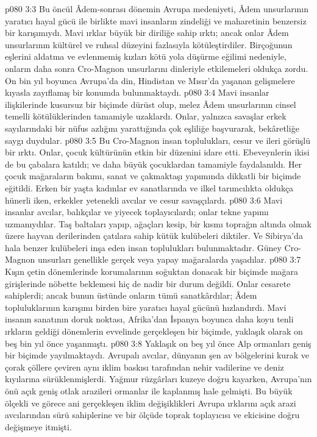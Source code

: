 \vs p080 3:3 Bu öncül Âdem\hyp{}sonrası dönemin Avrupa medeniyeti, Âdem unsurlarının yaratıcı hayal gücü ile birlikte mavi insanların zindeliği ve maharetinin benzersiz bir karışımıydı. Mavi ırklar büyük bir diriliğe sahip ırktı; ancak onlar Âdem unsurlarının kültürel ve ruhsal düzeyini fazlasıyla kötüleştirdiler. Birçoğunun eşlerini aldatma ve evlenmemiş kızları kötü yola düşürme eğilimi nedeniyle, onların daha sonra Cro\hyp{}Magnon unsurlarını dinleriyle etkilemeleri oldukça zordu. On bin yıl boyunca Avrupa’da din, Hindistan ve Mısır’da yaşanan gelişmelere kıyasla zayıflamış bir konumda bulunmaktaydı.
\vs p080 3:4 Mavi insanlar ilişkilerinde kusursuz bir biçimde dürüst olup, melez Âdem unsurlarının cinsel temelli kötülüklerinden tamamiyle uzaklardı. Onlar, yalnızca savaşlar erkek sayılarındaki bir nüfus azlığını yarattığında çok eşliliğe başvurarak, bekâretliğe saygı duydular.
\vs p080 3:5 Bu Cro\hyp{}Magnon insan toplulukları, cesur ve ileri görüşlü bir ırktı. Onlar, çocuk kültürünün etkin bir düzenini idare etti. Ebeveynlerin ikisi de bu çabalara katıldı; ve daha büyük çocuklardan tamamiyle faydalanıldı. Her çocuk mağaraların bakımı, sanat ve çakmaktaşı yapımında dikkatli bir biçimde eğitildi. Erken bir yaşta kadınlar ev sanatlarında ve ilkel tarımcılıkta oldukça hünerli iken, erkekler yetenekli avcılar ve cesur savaşçılardı.
\vs p080 3:6 Mavi insanlar avcılar, balıkçılar ve yiyecek toplayıcılardı; onlar tekne yapımı uzmanıydılar. Taş baltaları yapıp, ağaçları kesip, bir kısmı toprağın altında olmak üzere hayvan derilerinden çatılara sahip kütük kulübeleri diktiler. Ve Sibirya’da hala benzer kulübeleri inşa eden insan toplulukları bulunmaktadır. Güney Cro\hyp{}Magnon unsurları genellikle gerçek veya yapay mağaralarda yaşadılar.
\vs p080 3:7 Kışın çetin dönemlerinde korumalarının soğuktan donacak bir biçimde mağara girişlerinde nöbette beklemesi hiç de nadir bir durum değildi. Onlar cesarete sahiplerdi; ancak bunun üstünde onların tümü sanatkârdılar; Âdem topluluklarının karışımı birden bire yaratıcı hayal gücünü hızlandırdı. Mavi insanın sanatının doruk noktası, Afrika’dan İspanya boyunca daha koyu tenli ırkların geldiği dönemlerin evvelinde gerçekleşen bir biçimde, yaklaşık olarak on beş bin yıl önce yaşanmıştı.
\vs p080 3:8 Yaklaşık on beş yıl önce Alp ormanları geniş bir biçimde yayılmaktaydı. Avrupalı avcılar, dünyanın şen av bölgelerini kurak ve çorak çöllere çeviren aynı iklim baskısı tarafından nehir vadilerine ve deniz kıyılarına sürüklenmişlerdi. Yağmur rüzgârları kuzeye doğru kayarken, Avrupa’nın önü açık geniş otlak arazileri ormanlar ile kaplanmış hale gelmişti. Bu büyük ölçekli ve görece ani gerçekleşen iklim değişiklikleri Avrupa ırklarını açık arazi avcılarından sürü sahiplerine ve bir ölçüde toprak toplayıcısı ve ekicisine doğru değişmeye itmişti.

